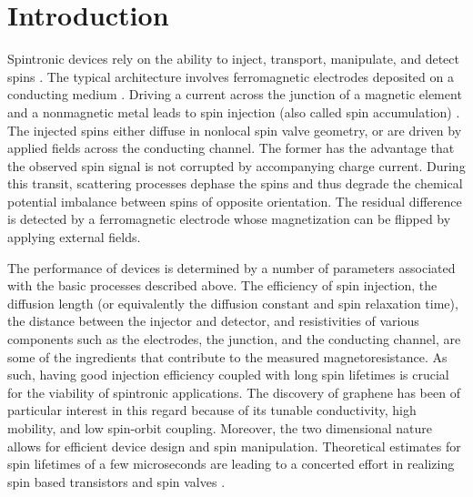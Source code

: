 \section{Introduction}

Spintronic devices rely on the ability to inject, transport, manipulate, and detect spins
\cite{Wolf16112001, RevModPhys.76.323}.
The typical architecture involves ferromagnetic electrodes deposited on a conducting medium
\cite{1990ApPhL..56..665D, Jedema2001}.
Driving a current across the junction of a magnetic element and a nonmagnetic metal
leads to spin injection (also called spin accumulation)
\cite{PhysRevLett.55.1790, Jedema2001, Yang2008, PhysRevLett.94.196601}.
The injected spins either diffuse in nonlocal spin valve geometry,
or are driven by applied fields across the conducting channel.
The former has the advantage that the observed spin signal
is not corrupted by accompanying charge current.
During this transit, scattering processes dephase the spins
and thus degrade the chemical potential imbalance between spins of opposite orientation.
The residual difference is detected by a ferromagnetic electrode
whose magnetization can be flipped by applying external fields.

The performance of devices is determined by a number of parameters
associated with the basic processes described above.
The efficiency of spin injection, the diffusion length
(or equivalently the diffusion constant and spin relaxation time),
the distance between the injector and detector,
and resistivities of various components such as the electrodes,
the junction, and the conducting channel,
are some of the ingredients that contribute to the measured magnetoresistance.
As such, having good injection efficiency coupled with long spin lifetimes
is crucial for the viability of spintronic applications.
The discovery of graphene
\cite{Novoselov22102004}
has been of particular interest in this regard
because of its tunable conductivity, high mobility, and low spin-orbit coupling.
Moreover, the two dimensional nature allows for efficient device design and spin manipulation.
Theoretical estimates for spin lifetimes of a few microseconds
\cite{PhysRevB.74.155426, Trauzettel2007}
are leading to a concerted effort in realizing spin based transistors and spin valves
\cite{Tombros2007, JJAP.46.L605, Cho2007, PhysRevLett.101.046601, 1704408, Han2012, Han2012369, PhysRevB.80.241403}.

